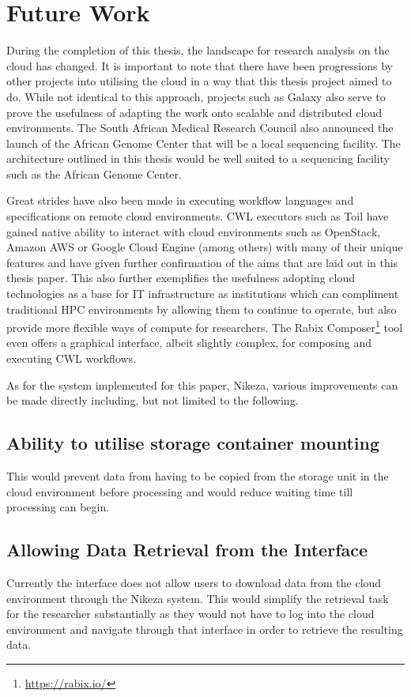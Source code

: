 \section{Future Work}

During the completion of this thesis, the landscape for research analysis on the cloud has changed. It is important to note that there have been progressions by other projects into utilising the cloud in a way that this thesis project aimed to do. While not identical to this approach, projects such as Galaxy also serve to prove the usefulness of adapting the work onto scalable and distributed cloud environments. The South African Medical Research Council also announced the launch of the African Genome Center that will be a local sequencing facility. The architecture outlined in this thesis would be well suited to a sequencing facility such as the African Genome Center.

Great strides have also been made in executing workflow languages and specifications on remote cloud environments. CWL executors such as Toil have gained native ability to interact with cloud environments such as OpenStack, Amazon AWS or Google Cloud Engine (among others) with many of their unique features and have given further confirmation of the aims that are laid out in this thesis paper. This also further exemplifies the usefulness adopting cloud technologies as a base for IT infrastructure as institutions which can compliment traditional HPC environments by allowing them to continue to operate, but also provide more flexible ways of compute for researchers. The Rabix Composer\footnote{\url{https://rabix.io/}} tool even offers a graphical interface, albeit slightly complex, for composing and executing CWL workflows.

As for the system implemented for this paper, Nikeza, various improvements can be made directly including, but not limited to the following.

\subsection{Ability to utilise storage container mounting}
This would prevent data from having to be copied from the storage unit in the cloud environment before processing and would reduce waiting time till processing can begin.

\subsection{Allowing Data Retrieval from the Interface}
Currently the interface does not allow users to download data from the cloud environment through the Nikeza system. This would simplify the retrieval task for the researcher substantially as they would not have to log into the cloud environment and navigate through that interface in order to retrieve the resulting data. 


